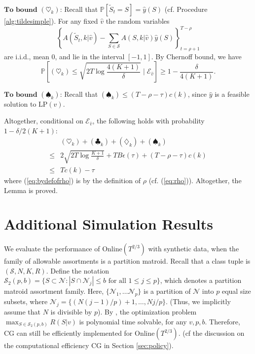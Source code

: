 \documentclass{article}
\theoremstyle{definition}
\newcommand{\PPP}{\mathbb{P}}
\newcommand{\NNN}{\mathcal{N}}
\newcommand{\SSS}{\mathcal{S}}
\begin{document}
$\textbf{To bound $(\heartsuit_k)$:}$ Recall that $\PPP[\tilde{S}_t = S] = \hat{y}(S)$ (cf. Procedure \ref{alg:tildesimple}). For any fixed $\hat{v}$ the random variables $$\left\{A(\tilde{S}_t, k|\hat{v}) - \sum_{S\in\SSS}A(S, k|\hat{v})\hat{y}(S)\right\}^{T-\rho}_{t = \rho+1}$$ are i.i.d., mean 0, and lie in the interval $[-1, 1]$. By Chernoff bound, we have
\begin{equation*}
\PPP\left[(\heartsuit_k) \leq \sqrt{2T\log\frac{4(K+1)}{\delta}}\mid \mathcal{E}_{\hat{v}}\right] \geq 1 - \frac{\delta}{4(K+1)}.
\end{equation*}

$\textbf{To bound $(\spadesuit_k)$:}$ Recall that $(\spadesuit_k)\leq (T-\rho-\tau)c(k)$, since $\hat{y}$ is a feasible solution to LP$(\hat{v})$.

Altogether, conditional on $\mathcal{E}_{\hat{v}}$, the following holds with probability $1-\delta/2(K+1)$:
\begin{align}
& (\heartsuit_k) + (\clubsuit_k) + (\diamondsuit_k) + (\spadesuit_k)\nonumber\\
\leq & 2\sqrt{2T\log{\frac{K+1}{\delta}}} + TB\epsilon(\tau) + (T-\rho-\tau)c(k)\nonumber\\
\leq & Tc(k) - \tau \label{eq:bydefofrho}
\end{align}
where (\ref{eq:bydefofrho}) is by the definition of $\rho$ (cf. (\ref{eq:rho})). Altogether, the Lemma is proved.

\section{Additional Simulation Results}\label{app:additionalsim}
We evaluate the performance of {\sc Online}$(T^{2/3})$ with synthetic data, when the family of allowable assortments is a partition matroid. Recall that a class tuple is $(\SSS, N, K, R)$. Define the notation $\SSS_2(p , b) = \{S\subset \NNN: |S\cap \NNN_j |\leq b \text{ for all }1\leq j\leq p\}$, which denotes a partition matroid assortment family. Here, $\{\NNN_1, \ldots \NNN_p\}$ is a partition of $\NNN$ into $p$ equal size subsets, where $\NNN_j = \{(N(j-1)/p) + 1, \ldots, Nj/p\}$. (Thus, we implicitly assume that $N$ is divisible by $p$). By \cite{DavisGT13}, the optimization problem $\max_{S\in \SSS_2(p, b)}R(S | v)$ is polynomial time solvable, for any  $v, p, b$. Therefore, CG can still be efficiently implemented for {\sc Online}$(T^{2/3})$. (cf the discussion on the computational efficiency CG in Section \ref{sec:policy}).
\end{document}
